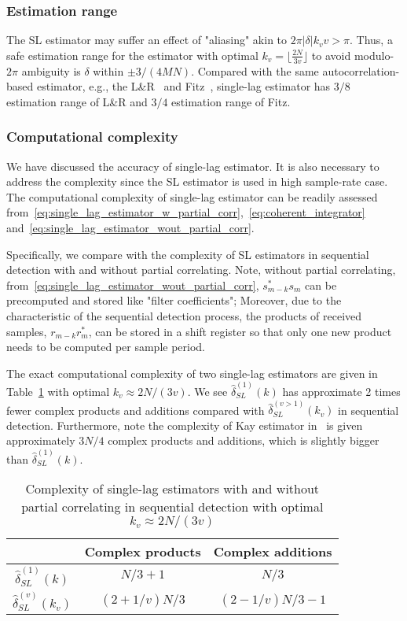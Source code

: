 \subsubsection{Estimation range}
The SL estimator may suffer an effect
of "aliasing" akin to $2\pi |\delta|k_vv{>}\pi$. Thus, a safe estimation range for the estimator with optimal $k_v=\lfloor\frac{2N}{3v}\rfloor$ to avoid modulo-$2\pi$ ambiguity
is $\delta$ within $\pm 3/(4MN)$. Compared with the same autocorrelation-based estimator, e.g.,
the L\&R~\cite{Luise_Reggiannini_95} and Fitz~\cite{Fitz_94}, single-lag estimator has 
$3/8$ estimation range of L\&R and $3/4$ estimation range of Fitz.

\subsubsection{Computational complexity}

We have discussed the accuracy of single-lag estimator.
It is also necessary to address the complexity since the SL estimator
is used in high sample-rate case. The computational complexity of single-lag estimator 
can be readily assessed from~\eqref{eq:single_lag_estimator_w_partial_corr},~\eqref{eq:coherent_integrator} and~\eqref{eq:single_lag_estimator_wout_partial_corr}.

Specifically, we compare with the complexity of SL estimators in sequential detection with and without partial correlating.
Note, without partial correlating, from~\eqref{eq:single_lag_estimator_wout_partial_corr},
$s_{m-k}^*s_m$ can be precomputed and stored
like "filter coefficients"; Moreover, due to the characteristic of the sequential detection process, the products of received samples, $r_{m-k}r_m^*$,
can be stored in a shift register so that only one new product needs to be computed per sample period.

The exact computational complexity of two single-lag estimators are given in Table~\ref{table:computational complexity comparison} with optimal $k_v \approx 2N/(3v)$. 
We see $\hat{\delta}_{SL}^{(1)}(k)$ has approximate 2 times fewer complex products and additions compared with $\hat{\delta}_{SL}^{(v>1)}(k_v)$ in sequential detection.
Furthermore, note the complexity of Kay estimator in~\cite{Morelli_Mengali_98} is given approximately $3N/4$ complex products and additions, 
which is slightly bigger than $\hat{\delta}_{SL}^{(1)}(k)$.

\begin{table}[t]
  \caption{Complexity of single-lag estimators with and without partial correlating in sequential detection with optimal $k_v\approx2N/(3v)$}  %
  \centering 
  \begin{tabular}{c c c} 
  \hline\hline 
   & Complex products & Complex additions \\ [0.5ex] 
  \hline 
  $\hat{\delta}_{SL}^{(1)}(k)$  & $N/3+1$ & $N/3$ \\ 
  $\hat{\delta}_{SL}^{(v)}(k_v)$ & $(2+1/v) N/3$ & $(2-1/v)N/3-1$ \\ [1ex]
  \hline
  \end{tabular}
  \label{table:computational complexity comparison}
\end{table}

